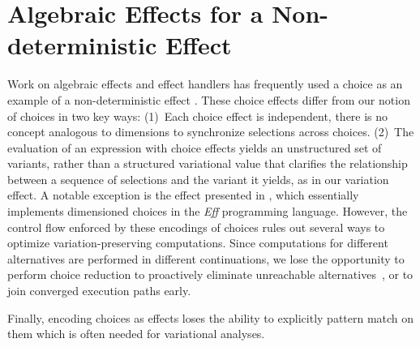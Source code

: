\section{Algebraic Effects for a Non-deterministic Effect}
Work on algebraic effects and effect handlers has frequently used a choice as an
example of a non-deterministic effect \cite{BP15effects,Pretnar15,Kammar2013,Plotkin2001}.  
These choice effects differ from our notion of choices in two key ways: (1)~Each choice effect is independent, there is no concept analogous to dimensions to synchronize selections across
choices. (2)~The evaluation of an expression with choice effects yields an
unstructured set of variants, rather than a structured variational value that clarifies
the relationship between a sequence of selections and the variant it yields, as
in our variation effect.
%
A notable exception is the  effect presented in
\cite{BP15effects}, which essentially implements dimensioned choices in the
\emph{Eff} programming language.
%
However, the control flow enforced by these encodings of choices rules out
several ways to optimize variation-preserving computations. Since computations
for different alternatives are performed in different continuations, we lose
the opportunity to perform choice reduction to proactively eliminate
unreachable alternatives~\cite{CEW14toplas}, or to join converged execution paths early.

Finally, encoding choices as effects loses the ability to explicitly pattern match on them which is often needed for variational analyses. 

